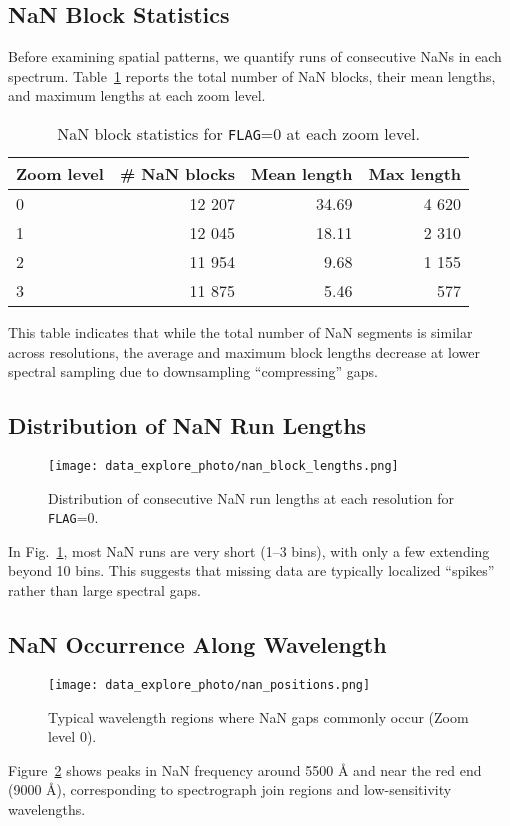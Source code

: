 \documentclass[english,bachelor,oneside]{ctufit-thesis}
\begin{document}
\subsection{NaN Block Statistics}
Before examining spatial patterns, we quantify runs of consecutive NaNs in each spectrum. Table~\ref{tab:nan_blocks} reports the total number of NaN blocks, their mean lengths, and maximum lengths at each zoom level.

\begin{table}[H]
  \centering
  \caption{NaN block statistics for \texttt{FLAG}=0 at each zoom level.}
  \label{tab:nan_blocks}
  \begin{tabular}{@{}lrrr@{}}
    \toprule
    Zoom level & \# NaN blocks & Mean length & Max length \\
    \midrule
    0 & 12 207 & 34.69 & 4 620 \\
    1 & 12 045 & 18.11 & 2 310 \\
    2 & 11 954 &  9.68 & 1 155 \\
    3 & 11 875 &  5.46 &   577 \\
    \bottomrule
  \end{tabular}
\end{table}

This table indicates that while the total number of NaN segments is similar across resolutions, the average and maximum block lengths decrease at lower spectral sampling due to downsampling “compressing” gaps.


\subsection{Distribution of NaN Run Lengths}
\begin{figure}[H]
    \centering
    \texttt{[image: data\_explore\_photo/nan\_block\_lengths.png]}
    \caption{Distribution of consecutive NaN run lengths at each resolution for \texttt{FLAG}=0.}
    \label{fig:nan_block_lengths}
\end{figure}
\noindent
 In Fig.~\ref{fig:nan_block_lengths}, most NaN runs are very short (1–3 bins), with only a few extending beyond 10 bins. This suggests that missing data are typically localized “spikes” rather than large spectral gaps.


\subsection{NaN Occurrence Along Wavelength}
\begin{figure}[H]
    \centering
    \texttt{[image: data\_explore\_photo/nan\_positions.png]}
    \caption{Typical wavelength regions where NaN gaps commonly occur (Zoom level 0).}
    \label{fig:nan_positions}
\end{figure}
\noindent
Figure~\ref{fig:nan_positions} shows peaks in NaN frequency around 5500 Å and near the red end (9000 Å), corresponding to spectrograph join regions and low-sensitivity wavelengths.  
\end{document}
